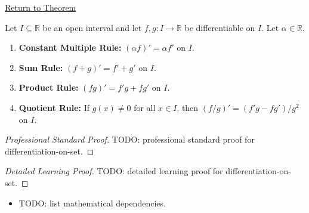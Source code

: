 \newpage
{}
\label{prf:differentiation-on-set}

\begin{remark*}[Return]
\hyperref[thm:finite-linear-combination-rule-interval]{Return to Theorem}
\end{remark*}

\begin{theorem*}
Let $I \subseteq \mathbb{R}$ be an open interval and let $f, g : I \to \mathbb{R}$ be differentiable on $I$. Let $\alpha \in \mathbb{R}$.
\begin{enumerate}
  \item \textbf{Constant Multiple Rule:} $(\alpha f)' = \alpha f'$ on $I$.
  \item \textbf{Sum Rule:} $(f + g)' = f' + g'$ on $I$.
  \item \textbf{Product Rule:} $(fg)' = f'g + fg'$ on $I$.
  \item \textbf{Quotient Rule:} If $g(x) \neq 0$ for all $x \in I$, then $(f/g)' = (f'g - fg')/g^2$ on $I$.
\end{enumerate}
\end{theorem*}

\begin{proof}[Professional Standard Proof]
\LRAProofBodyStart
TODO: professional standard proof for differentiation-on-set.
\end{proof}

\begin{proof}[Detailed Learning Proof]
\LRAProofBodyStart
TODO: detailed learning proof for differentiation-on-set.
\end{proof}

\begin{remark*}
\end{remark*}

\begin{dependencies}
\begin{itemize}
  \item TODO: list mathematical dependencies.
\end{itemize}
\end{dependencies}

\clearpage
